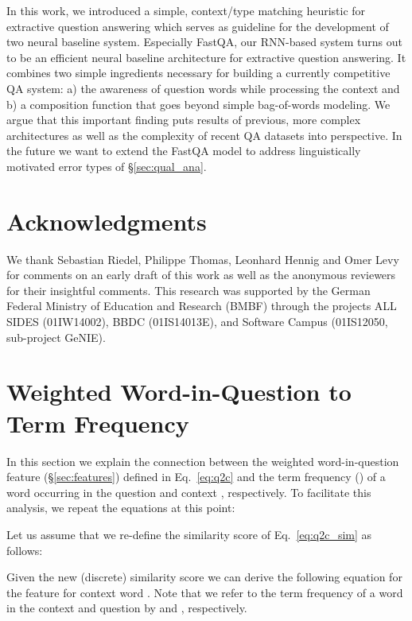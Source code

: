 \documentclass[11pt,a4paper]{article}
\begin{document}
In this work, we introduced a simple, context/type matching heuristic for extractive question answering which serves as guideline for the development of two neural baseline system. Especially FastQA, our RNN-based system turns out to be an efficient neural baseline architecture for extractive question answering. It combines two simple ingredients necessary for building a currently competitive QA system: a) the awareness of question words while processing the context and b) a composition function that goes beyond simple bag-of-words modeling. We argue that this important finding puts results of previous, more complex architectures as well as the complexity of recent QA datasets into perspective. In the future we want to extend the FastQA model to address linguistically motivated error types of \S\ref{sec:qual_ana}.

\section*{Acknowledgments}
We thank Sebastian Riedel, Philippe Thomas, Leonhard Hennig and Omer Levy for comments on an early draft of this work as well as the anonymous reviewers for their insightful comments. This research was supported by the German Federal Ministry of Education and 
Research (BMBF) through the projects ALL SIDES (01IW14002), BBDC (01IS14013E), and Software Campus (01IS12050, sub-project GeNIE).




\clearpage

\appendix

\section{Weighted Word-in-Question to Term Frequency}\label{sec:wiq_tf}


In this section we explain the connection between the weighted word-in-question feature (\S\ref{sec:features}) defined in Eq.~\ref{eq:q2c} and the term frequency () of a word occurring in the question  and context , respectively. To facilitate this analysis, we repeat the equations at this point:



Let us assume that we re-define the similarity score  of Eq.~\ref{eq:q2c_sim} as follows:



Given the new (discrete) similarity score we can derive the following equation for the  feature for context word . Note that we refer to the term frequency of a word  in the context and question by  and , respectively.
\end{document}
